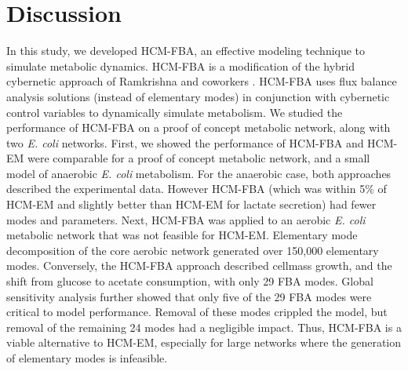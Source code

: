 \documentclass[10pt,twocolumn,twoside,final]{IEEEtran}
\begin{document}
\section{Discussion}
In this study, we developed HCM-FBA, an effective modeling technique to simulate metabolic dynamics.
HCM-FBA is a modification of the hybrid cybernetic approach of Ramkrishna and coworkers \cite{2008_kim_varner_ramkrishna_BiotechProg}.
HCM-FBA uses flux balance analysis solutions (instead of elementary modes) in conjunction with cybernetic control variables to dynamically simulate metabolism.
We studied the performance of HCM-FBA on a proof of concept metabolic network, along with two \emph{E. coli} networks.
First, we showed the performance of HCM-FBA and HCM-EM were comparable for a proof of concept metabolic network, and a small model of anaerobic \textit{E. coli} metabolism.
For the anaerobic case, both approaches described the experimental data.
However HCM-FBA (which was within 5\% of HCM-EM and slightly better than HCM-EM for lactate secretion) had fewer modes and parameters.
Next, HCM-FBA was applied to an aerobic \textit{E. coli} metabolic network that was not feasible for HCM-EM.
Elementary mode decomposition of the core aerobic network generated over 150,000 elementary modes.
Conversely, the HCM-FBA approach described cellmass growth, and the shift from glucose to acetate consumption, with only 29 FBA modes.
Global sensitivity analysis further showed that only five of the 29 FBA modes were critical to model performance.
Removal of these modes crippled the model, but removal of the remaining 24 modes had a negligible impact.
Thus, HCM-FBA is a viable alternative to HCM-EM, especially for large networks where the generation of elementary modes is infeasible.
\end{document}
